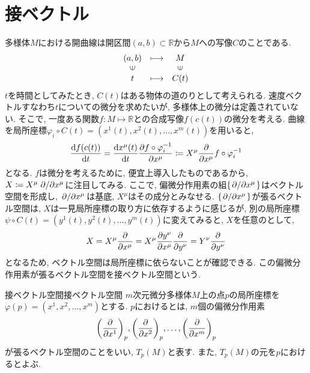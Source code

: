 \documentclass[../main]{subfiles}
\begin{document}
\section{接ベクトル}
    多様体$M$における開曲線は開区間$(a,b)\subset\mathbb{R}$から$M$への写像$C$のことである. 
    \begin{equation}
        \begin{array}{ccc}
            (a,b)  & \longmapsto & M \\
            \rotatebox{90}{$\in$} & & \rotatebox{90}{$\in$} \\
            t & \longmapsto & C(t)
        \end{array}
    \end{equation}
    $t$を時間としてみたとき, $C(t)$はある物体の道のりとして考えられる.  速度ベクトルすなわち$t$についての微分を求めたいが, 多様体上の微分は定義されていない. そこで, 一度ある関数$f:M \mapsto \mathbb{R}$との合成写像$f(c(t))$の微分を考える. 曲線を局所座標$\varphi_i \circ C(t)=(x^1(t),x^2(t),\ldots,x^m(t))$を用いると, 
    \begin{equation}
        \dv{f(c(t))}{t} = \dv{x^\mu(t)}{t}\pdv{f\circ\varphi_i^{-1}}{x^\mu} 
                        \coloneqq X^\mu\pdv{x^\mu}f\circ\varphi_i^{-1}
    \end{equation}
    となる. $f$は微分を考えるために, 便宜上導入したものであるから, $X\coloneqq X^\mu \pdv*{x^\mu}$に注目してみる. ここで, 偏微分作用素の組$\{\pdv*{x^\mu}\}$はベクトル空間を形成し, $\pdv*{x^\mu}$は基底, $X^\mu$はその成分とみなせる. $\{\pdv*{x^\mu}\}$が張るベクトル空間は,  $X$は一見局所座標の取り方に依存するように感じるが, 別の局所座標$\psi \circ C(t)=(y^1(t),y^2(t),\ldots,y^m(t))$に変えてみると,  $X$を任意のとして, 
    \begin{equation}
        X = X^\mu\pdv{x^\mu} 
          = X^\mu \pdv{y^\nu}{x^\mu}\pdv{y^\nu}
          = Y^\nu \pdv{y^\nu}
    \end{equation}
    となるため, ベクトル空間は局所座標に依らないことが確認できる. この偏微分作用素が張るベクトル空間を接ベクトル空間という. 
    
    \begin{dfn}{接ベクトル空間}{接ベクトル空間}
        $m$次元微分多様体$M$上の点$p$の局所座標を$\varphi(p)=(x^1,x^2,\ldots,x^m)$とする. $p$におけるとは, 
        $m$個の偏微分作用素
        \begin{equation}
            \qty(\pdv{x^1})_p, \qty(\pdv{x^2})_p, \ldots, \qty(\pdv{x^m})_p
        \end{equation}
        が張るベクトル空間のことをいい, $T_p(M)$と表す. また, $T_p(M)$の元を$p$におけるとよぶ. 
    \end{dfn}
\end{document}
